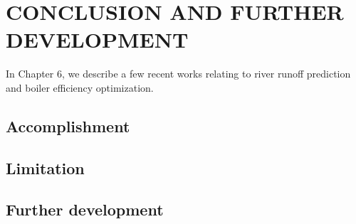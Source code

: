 \chapter{CONCLUSION AND FURTHER DEVELOPMENT}
\label{chap:relatedwork}

In Chapter 6, we describe a few recent works relating to river runoff prediction and boiler efficiency optimization.

\minitoc

\section{Accomplishment}
\section{Limitation}
\section{Further development}

